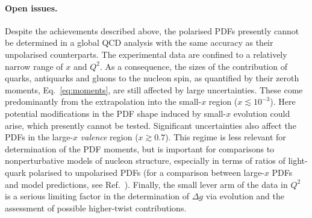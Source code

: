 \paragraph{Open issues.}

Despite the achievements described above, the polarised PDFs presently cannot 
be determined in a global QCD analysis with the same accuracy as their 
unpolarised counterparts.
%
The experimental data are confined to a relatively narrow range of 
$x$ and $Q^2$.
%
As a consequence, the sizes of the contribution of quarks, antiquarks and 
gluons to the nucleon spin, as quantified by their zeroth moments, 
Eq.~\eqref{eq:moments}, are still affected by large uncertainties. 
%
These come predominantly from the extrapolation into the small-$x$ region 
($x\lesssim 10^{-3}$). 
%
Here potential modifications in the PDF shape induced by small-$x$ evolution 
could arise, which presently cannot be tested.
%
Significant uncertainties also affect the PDFs in the large-$x$ 
{\it valence} region ($x\gtrsim 0.7$). 
%
This regime is less relevant for determination of the PDF moments, but is 
important for comparisons to nonperturbative models of nucleon structure, 
especially in terms of ratios of light-quark polarised to unpolarised PDFs 
(for a comparison between large-$x$ PDFs 
and model predictions, see Ref.~\cite{Nocera:2014uea}).
%
Finally, the small lever arm of the data in $Q^2$ is a serious limiting factor 
in the determination of $\Delta g$ via evolution and the assessment of possible 
higher-twist contributions. 

